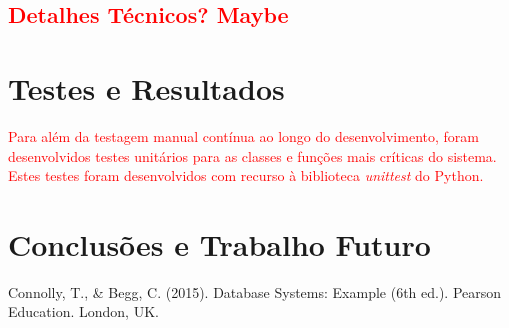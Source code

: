 \documentclass[a4paper,12pt]{scrreprt}
\begin{document}
\section{\textcolor{red}{Detalhes Técnicos? Maybe}}



\chapter{Testes e Resultados}

\textcolor{red}{
    Para além da testagem manual contínua ao longo do desenvolvimento, foram
    desenvolvidos testes unitários para as classes e funções mais críticas do
    sistema. Estes testes foram desenvolvidos com recurso à biblioteca
    \textit{unittest} do Python.
}



\chapter{Conclusões e Trabalho Futuro}



\renewcommand\bibname{Referências}

\begin{thebibliography}{9}

Connolly, T., \& Begg, C. (2015). Database Systems: Example (6th ed.). Pearson Education. London, UK.


\end{thebibliography}
\end{document}
